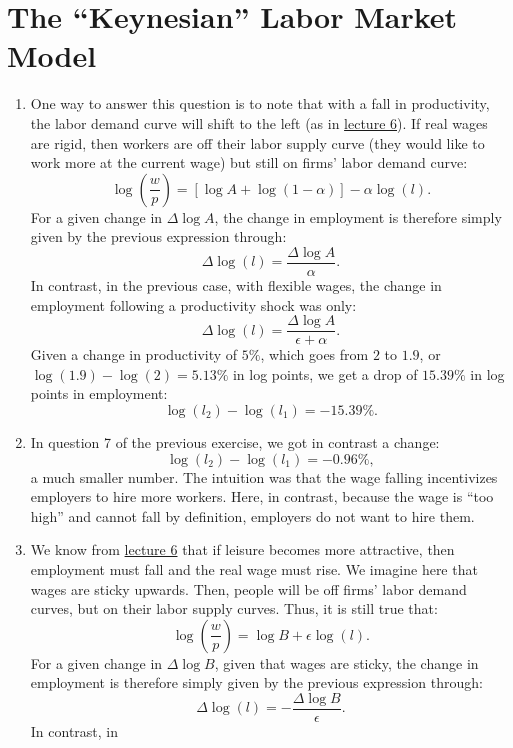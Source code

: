 \documentclass[]{book}
\theoremstyle{definition}
\theoremstyle{definition}
\theoremstyle{definition}
\theoremstyle{remark}
\begin{document}
\section*{\texorpdfstring{The ``Keynesian'' Labor Market
Model}{The Keynesian Labor Market Model}}\label{the-keynesian-labor-market-model-1}

\begin{enumerate}
\def\labelenumi{\arabic{enumi}.}
\item
  One way to answer this question is to note that with a fall in
  productivity, the labor demand curve will shift to the left (as in
  \protect\hyperlink{labor-market}{lecture 6}). If real wages are rigid,
  then workers are off their labor supply curve (they would like to work
  more at the current wage) but still on firms' labor demand curve:
  \[\log\left(\frac{w}{p}\right) = \left[\log A + \log(1-\alpha)\right] -\alpha \log(l).\]
  For a given change in \(\Delta \log A\), the change in employment is
  therefore simply given by the previous expression through:
  \[\Delta \log(l)=\frac{\Delta \log A}{\alpha}.\] In contrast, in the
  previous case, with flexible wages, the change in employment following
  a productivity shock was only:
  \[\Delta \log(l) = \frac{\Delta \log A}{\epsilon+\alpha}.\] Given a
  change in productivity of \(5\%\), which goes from \(2\) to \(1.9\),
  or \(\log(1.9)-\log(2)=5.13\%\) in log points, we get a drop of
  \(15.39\%\) in log points in employment:
  \[\log(l_2)-\log(l_1)=-15.39\%.\]
\item
  In question 7 of the previous exercise, we got in contrast a change:
  \[\log(l_2)-\log(l_1)=-0.96\%,\] a much smaller number. The intuition
  was that the wage falling incentivizes employers to hire more workers.
  Here, in contrast, because the wage is ``too high'' and cannot fall by
  definition, employers do not want to hire them.
\item
  We know from \protect\hyperlink{labor-market}{lecture 6} that if
  leisure becomes more attractive, then employment must fall and the
  real wage must rise. We imagine here that wages are sticky upwards.
  Then, people will be off firms' labor demand curves, but on their
  labor supply curves. Thus, it is still true that:
  \[\log\left(\frac{w}{p}\right)=\log B + \epsilon \log(l).\] For a
  given change in \(\Delta \log B\), given that wages are sticky, the
  change in employment is therefore simply given by the previous
  expression through:
  \[\Delta \log(l)=-\frac{\Delta \log B}{\epsilon}.\] In contrast, in

\end{enumerate}
\end{document}
